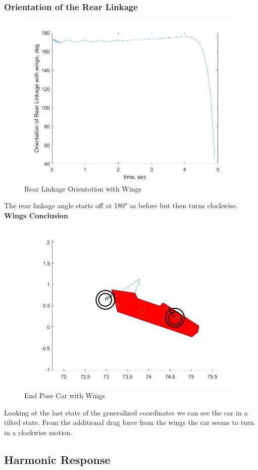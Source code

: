 \subsubsection{Orientation of the Rear Linkage}
\begin{figure}[ht]
    \centering
    \includegraphics[scale=0.35]{images/rear_linkage_angle_with_wings.jpg}
    \caption{Rear Linkage Orientation with Wings}
    \label{fig:rear_linkage_wings}
\end{figure}
The rear linkage angle starts off at 180° as before but then turns clockwise.
\clearpage
\textbf{Wings Conclusion}
\begin{figure}[ht]
    \centering
    \includegraphics[scale=0.35]{images/end_position_wings.jpg}
    \caption{End Pose Car with Wings}
    \label{fig:end_position_wings}
\end{figure}
Looking at the last state of the generalized coordinates we can see the car in a tilted state. From the additional drag force from the wings the car seems to turn in a clockwise motion.
\subsection{Harmonic Response}

